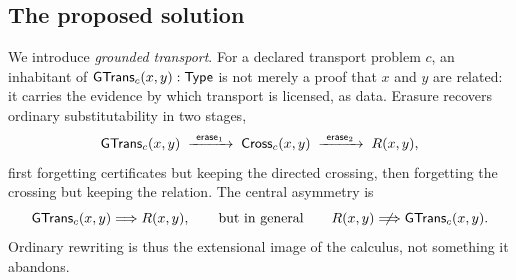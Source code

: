 \subsection{The proposed solution}
We introduce \emph{grounded transport}. For a declared transport problem $c$, an inhabitant of $\mathsf{GTrans}_c(x,y) : \mathsf{Type}$ is not merely a proof that $x$ and $y$ are related: it carries the evidence by which transport is licensed, as data. Erasure recovers ordinary substitutability in two stages,
\[
\mathsf{GTrans}_c(x,y) \;\xrightarrow{\ \mathsf{erase}_1\ }\; \mathsf{Cross}_c(x,y) \;\xrightarrow{\ \mathsf{erase}_2\ }\; R(x,y),
\]
first forgetting certificates but keeping the directed crossing, then forgetting the crossing but keeping the relation. The central asymmetry is
\[
\GTrans_c(x,y) \Longrightarrow R(x,y), \qquad\text{but in general}\qquad R(x,y) \centernot\Longrightarrow \GTrans_c(x,y).
\]
Ordinary rewriting is thus the extensional image of the calculus, not something it abandons.


